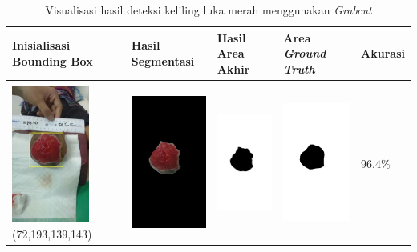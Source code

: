 \begin{table}[H]
	\centering
	\caption{Visualisasi hasil deteksi keliling luka merah menggunakan \emph{Grabcut}}
	\label{tabel_hasil_12}
	\begin{tabular}{|m{1.0in}|m{1.0in}|m{1.0in}|m{1.0in}|m{0.6in}|}
		\hline
		\textbf{Inisialisasi Bounding Box} & \textbf{Hasil Segmentasi} & \textbf{Hasil Area Akhir} & \textbf{Area \emph{Ground Truth}} & \textbf{Akurasi} \\
		\hline

		&  &  & \\
		\includegraphics[width=1.0in]{gambar/hasil_segmentasi/luka_merah/image_9_rect.jpg} {\centering\fontsize{10}{10}\selectfont(72,193,139,143)}&
		\includegraphics[width=1.0in]{gambar/hasil_segmentasi/luka_merah/result_9.jpg}&
		\includegraphics[width=1.0in]{gambar/hasil_segmentasi/luka_merah/mask_r_9.jpg}&
		\includegraphics[width=1.0in]{gambar/hasil_segmentasi/luka_merah/9_r.jpg}&
		96,4\% \\
		\hline


\end{tabular}
\end{table}
